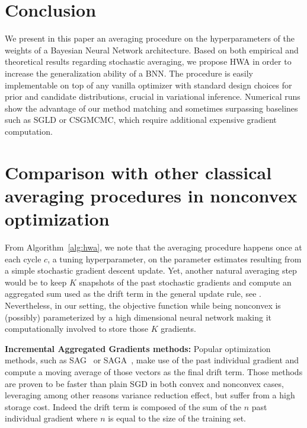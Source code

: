 \documentclass[tablecaption=bottom,wcp]{jmlr} %
\begin{document}
\section{Conclusion}\label{sec:conclusion}
We present in this paper an averaging procedure on the hyperparameters of the weights of a Bayesian Neural Network architecture.
Based on both empirical and theoretical results regarding stochastic averaging, we propose HWA in order to increase the generalization ability of a BNN.
The procedure is easily implementable on top of any vanilla optimizer with standard design choices for prior and candidate distributions, crucial in variational inference.
Numerical runs show the advantage of our method matching and sometimes surpassing baselines such as SGLD or CSGMCMC, which require additional expensive gradient computation.


\clearpage



\clearpage
\appendix

  \hsize\textwidth
  \linewidth\hsize {}
 \bottomtitlebar 
 
\section{Comparison with other classical averaging procedures in nonconvex optimization}
From Algorithm~\ref{alg:hwa}, we note that the averaging procedure happens once at each cycle $c$, a tuning hyperparameter, on the parameter estimates resulting from a simple stochastic gradient descent update.
Yet, another natural averaging step would be to keep $K$ snapshots of the past stochastic gradients and compute an aggregated sum used as the drift term in the general update rule, see \citep{zhou2017convergence}.
Nevertheless, in our setting, the objective function while being nonconvex is (possibly) parameterized by a high dimensional neural network making it computationally involved to store those $K$ gradients.


\textbf{Incremental Aggregated Gradients methods:} Popular optimization methods, such as SAG~\citep{schmidt2017minimizing} or SAGA~\citep{defazio2014saga}, make use of the past individual gradient and compute a moving average of those vectors as the final drift term. Those methods are proven to be faster than plain SGD in both convex and nonconvex cases, leveraging among other reasons variance reduction effect, but suffer from a high storage cost. Indeed the drift term is composed of the sum of the $n$ past individual gradient where $n$ is equal to the size of the training set.
\end{document}

